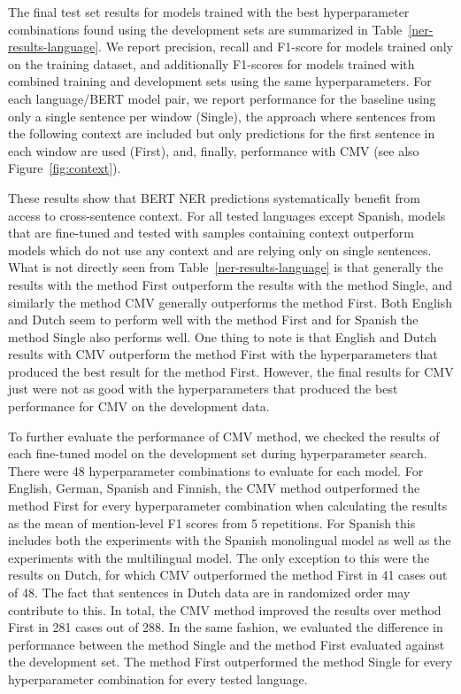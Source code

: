 \documentclass[11pt]{article}
\begin{document}
The final test set results for models trained with the best hyperparameter combinations found using the development sets are summarized in Table~\ref{ner-results-language}. We report precision, recall and F1-score for models trained only on the training dataset, and additionally F1-scores for models trained with combined training and development sets using the same hyperparameters. For each language/BERT model pair, we report performance for the baseline using only a single sentence per window (Single), the approach where sentences from the following context are included but only predictions for the first sentence in each window are used (First), and, finally, performance with CMV (see also Figure~\ref{fig:context}).

These results show that BERT NER predictions systematically benefit from access to cross-sentence context. For all tested languages except Spanish, models that are fine-tuned and tested with samples containing context outperform models which do not use any context and are relying only on single sentences. What is not directly seen from Table~\ref{ner-results-language} is that generally the results with the method First outperform the results with the method Single, and similarly the method CMV generally outperforms the method First. Both English and Dutch seem to perform well with the method First and for Spanish the method Single also performs well. One thing to note is that English and Dutch results with CMV outperform the method First with the hyperparameters that produced the best result for the method First.
However, the final results for CMV just were not as good with the hyperparameters that produced the best performance for CMV on the development data. 

To further evaluate the performance of CMV method, we checked the results of each fine-tuned model on the development set during hyperparameter search. There were 48 hyperparameter combinations to evaluate for each model. For English, German, Spanish and Finnish, the CMV method outperformed the method First for every hyperparameter combination when calculating the results as the mean of mention-level F1 scores from 5 repetitions. For Spanish this includes both the experiments with the Spanish monolingual model as well as the experiments with the multilingual model. The only exception to this were the results on Dutch, for which CMV outperformed the method First in 41 cases out of 48. The fact that sentences in Dutch data are in randomized order may contribute to this. In total, the CMV method improved the results over method First in 281 cases out of 288.
In the same fashion, we evaluated the difference in performance between the method Single and the method First evaluated against the development set. The method First outperformed the method Single for every hyperparameter combination for every tested language. 
\end{document}
